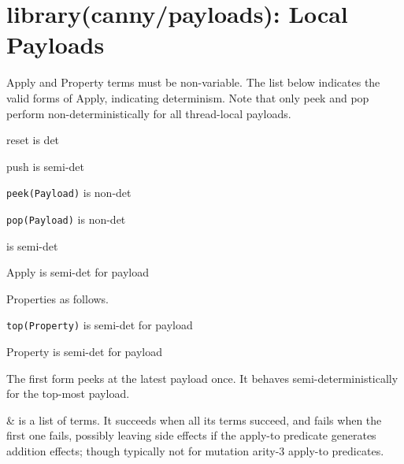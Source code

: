\chapter{library(canny/payloads): Local Payloads}\label{sec:payloads}

Apply and Property terms must be non-variable. The list below
indicates the valid forms of Apply, indicating determinism. Note that
only peek and pop perform non-deterministically for all thread-local
payloads.

\begin{shortlist}
    \item reset is det
    \item push is semi-det
    \item \verb$peek(Payload)$ is non-det
    \item \verb$pop(Payload)$ is non-det
    \item [Apply0\Sbar{}Applies] is semi-det
    \item Apply is semi-det for payload
\end{shortlist}

Properties as follows.

\begin{shortlist}
    \item \verb$top(Property)$ is semi-det for payload
    \item Property is semi-det for payload
\end{shortlist}

The first form  peeks at the latest payload once. It behaves
semi-deterministically for the top-most payload.\vspace{0.7cm}

\begin{description}
\nodescription

\begin{arguments}
 & is a list of  terms. It succeeds when all its
 terms succeed, and fails when the first one fails, possibly
leaving side effects if the apply-to predicate generates addition
effects; though typically not for mutation arity-3 apply-to
predicates. \\
\end{arguments}

\end{description}

